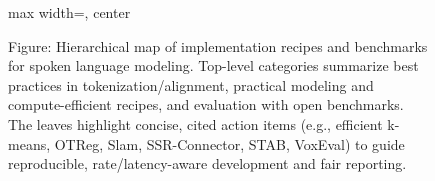 \begin{figure}[h]
\begin{adjustbox}{max width=\textwidth, center}
\end{adjustbox}

\caption{Figure: Hierarchical map of implementation recipes and benchmarks for spoken language modeling. Top-level categories summarize best practices in tokenization/alignment, practical modeling and compute-efficient recipes, and evaluation with open benchmarks. The leaves highlight concise, cited action items (e.g., efficient k-means, OTReg, Slam, SSR-Connector, STAB, VoxEval) to guide reproducible, rate/latency-aware development and fair reporting.}
\label{fig:tiny_tree_figure_10}

\end{figure}